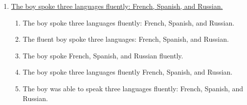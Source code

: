 \begin{enumerate}
\item \ul{The boy spoke three languages fluently: French, Spanish, and Russian.}

\begin{enumerate}[label=(\Alph*)]
\item The boy spoke three languages fluently: French, Spanish, and Russian. 
\item The fluent boy spoke three languages: French, Spanish, and Russian.
\item The boy spoke French, Spanish, and Russian fluently.
\item The boy spoke three languages fluently French, Spanish, and Russian. 
\item The boy was able to speak three languages fluently: French, Spanish, and Russian. 
\end{enumerate}

\end{enumerate}